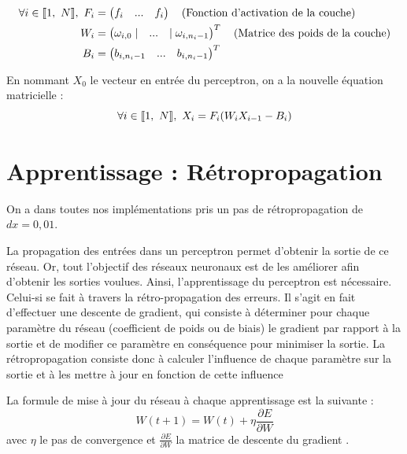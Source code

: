 \begin{align*}
\forall i \in \llbracket 1,\ N \rrbracket,\ F_i &= \begin{pmatrix} f_i & ... & f_i \end{pmatrix}\quad \text{(Fonction d'activation de la couche)}\\
                            W_i &= \begin{pmatrix} \omega_{i,0} \mid & ... & \mid \omega_{i, n_i-1}\end{pmatrix}^T \quad \text{(Matrice des poids de la couche)} \\
                            B_i &= \begin{pmatrix} b_{i, n_i-1} & ... & b_{i, n_i-1}\end{pmatrix}^T 
\end{align*}

En nommant $X_0$ le vecteur en entrée du perceptron, on a la nouvelle équation matricielle : 
\begin{equation}
  \forall i \in \brackets{1,\ N},\ X_i = F_i(W_i X_{i-1} - B_i) 
  \label{equation_propagation_matricielle}
\end{equation}

\section{Apprentissage : Rétropropagation}
\begin{remark}
On a dans toutes nos implémentations pris un pas de rétropropagation de $dx=0,01$.
\end{remark}

La propagation des entrées dans un perceptron permet d'obtenir la sortie de ce réseau. Or, tout l'objectif des réseaux neuronaux est de les améliorer afin d'obtenir les sorties voulues. Ainsi, l'apprentissage du perceptron est nécessaire. Celui-si se fait à travers la rétro-propagation des erreurs. Il s'agit en fait d'effectuer une descente de gradient, qui consiste à déterminer pour chaque paramètre du réseau (coefficient de poids ou de biais) le gradient par rapport à la sortie et de modifier ce paramètre en conséquence pour minimiser la sortie. La rétropropagation  consiste donc à calculer l’influence de chaque paramètre sur la sortie et à les mettre à jour en fonction de cette influence

La formule de mise à jour du réseau à chaque apprentissage est la suivante :
\[
W(t+1) = W(t) + \eta \frac{\partial E}{\partial W} 
\]
avec $\eta$ le pas de convergence et $\frac{\partial E}{\partial W} $ la matrice de descente du gradient .\\

